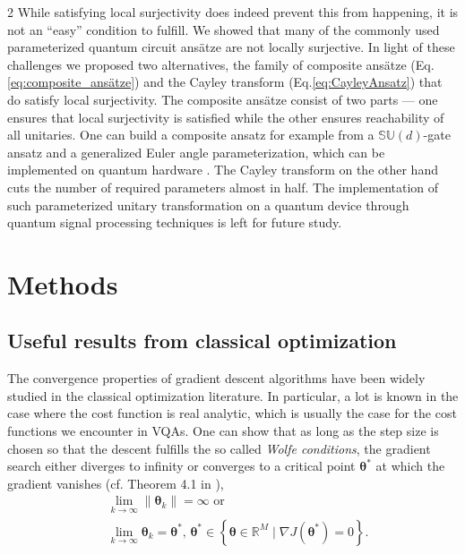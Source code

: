 \documentclass{article}
\renewcommand{\vec}[1]{\ensuremath{\boldsymbol{#1}}}
\begin{document}
\begin{multicols}{2}
While satisfying local surjectivity does indeed prevent this from happening, it is not an ``easy'' condition to fulfill.
We showed that many of the commonly used parameterized quantum circuit ans\"atze are not locally surjective. In light of these challenges we proposed two alternatives, the family of composite ansätze (Eq.  \eqref{eq:composite_ansätze}) and the Cayley transform (Eq.\eqref{eq:CayleyAnsatz}) that do satisfy local surjectivity. The composite ansätze consist of two parts --- one ensures that local surjectivity is satisfied while the other ensures reachability of all unitaries.
One can build a composite ansatz for example from a \(\mathbb{SU}(d)\)-gate ansatz and a generalized Euler angle parameterization, which can be implemented on quantum hardware \cite{wiersema_here_2024, tilma_generalized_2002}.
The Cayley transform on the other hand cuts the number of required parameters almost in half. The implementation of such parameterized unitary transformation on a quantum device through quantum signal processing techniques is left for future study.


\end{multicols}

\section{Methods}
\label{sec:Methods}

\subsection{Useful results from classical optimization}
\label{sec:classical_optimization}
The convergence properties of gradient descent algorithms have been widely studied in the classical optimization literature. In particular, a lot is known in the case where the cost function is real analytic, which is usually the case for the cost functions we encounter in \glspl{VQA}.
One can show that as long as the step size is chosen so that the descent fulfills the so called \textit{Wolfe conditions}, the gradient search either diverges to infinity or converges to a critical point \(\vec{\theta}^*\) at which the gradient vanishes (cf. Theorem 4.1 in \cite{absil_convergence_2005}),
\begin{align}
    &\lim_{k \rightarrow \infty} \lVert \vec{\theta}_k \rVert = \infty \text{ or } \nonumber \\
    &\lim_{k \rightarrow \infty} \vec{\theta}_k = \vec{\theta}^* , \, \vec{\theta}^* \in \left\{\vec{\theta} \in \mathds{R}^M \mid \nabla J (\vec{\theta}^*) = 0 \right\}.
\end{align}
\end{document}
